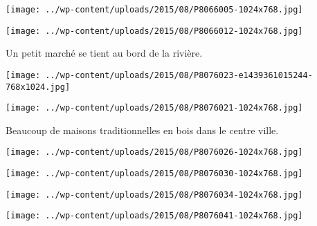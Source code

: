  

 

\begin{center} \texttt{[image: ../wp-content/uploads/2015/08/P8066005-1024x768.jpg]} \end{center}

 

 

\begin{center} \texttt{[image: ../wp-content/uploads/2015/08/P8066012-1024x768.jpg]} \end{center}

 

 Un petit marché se tient au bord de la rivière. 

 

\begin{center} \texttt{[image: ../wp-content/uploads/2015/08/P8076023-e1439361015244-768x1024.jpg]} \end{center}

 

 

\begin{center} \texttt{[image: ../wp-content/uploads/2015/08/P8076021-1024x768.jpg]} \end{center}

 

 Beaucoup de maisons traditionnelles en bois dans le centre ville. 

 

\begin{center} \texttt{[image: ../wp-content/uploads/2015/08/P8076026-1024x768.jpg]} \end{center}

 

 

\begin{center} \texttt{[image: ../wp-content/uploads/2015/08/P8076030-1024x768.jpg]} \end{center}

 

 

\begin{center} \texttt{[image: ../wp-content/uploads/2015/08/P8076034-1024x768.jpg]} \end{center}

 

 

\begin{center} \texttt{[image: ../wp-content/uploads/2015/08/P8076041-1024x768.jpg]} \end{center}

